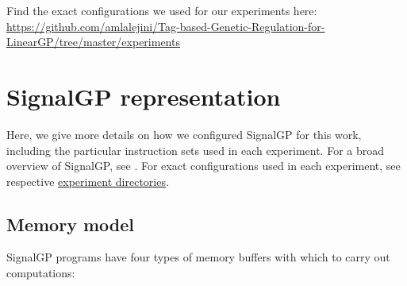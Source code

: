 \documentclass[]{book}
\begin{document}
Find the exact configurations we used for our experiments here: \url{https://github.com/amlalejini/Tag-based-Genetic-Regulation-for-LinearGP/tree/master/experiments}

\hypertarget{signalgp-representation}{%
\chapter{SignalGP representation}\label{signalgp-representation}}

Here, we give more details on how we configured SignalGP for this work, including the particular instruction sets used in each experiment.
For a broad overview of SignalGP, see \citep{lalejini_evolving_2018}.
For exact configurations used in each experiment, see respective \href{https://github.com/amlalejini/Tag-based-Genetic-Regulation-for-LinearGP/tree/master/experiments}{experiment directories}.

\hypertarget{memory-model}{%
\section{Memory model}\label{memory-model}}

SignalGP programs have four types of memory buffers with which to carry out computations:
\end{document}
